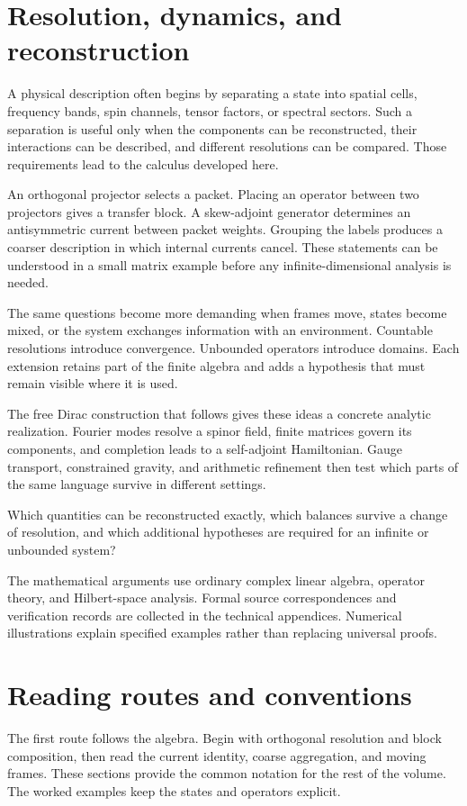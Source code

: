 \section*{Resolution, dynamics, and reconstruction}
A physical description often begins by separating a state into spatial cells, frequency bands, spin channels, tensor factors, or spectral sectors. Such a separation is useful only when the components can be reconstructed, their interactions can be described, and different resolutions can be compared. Those requirements lead to the calculus developed here.

An orthogonal projector selects a packet. Placing an operator between two projectors gives a transfer block. A skew-adjoint generator determines an antisymmetric current between packet weights. Grouping the labels produces a coarser description in which internal currents cancel. These statements can be understood in a small matrix example before any infinite-dimensional analysis is needed.

The same questions become more demanding when frames move, states become mixed, or the system exchanges information with an environment. Countable resolutions introduce convergence. Unbounded operators introduce domains. Each extension retains part of the finite algebra and adds a hypothesis that must remain visible where it is used.

The free Dirac construction that follows gives these ideas a concrete analytic realization. Fourier modes resolve a spinor field, finite matrices govern its components, and completion leads to a self-adjoint Hamiltonian. Gauge transport, constrained gravity, and arithmetic refinement then test which parts of the same language survive in different settings.

\begin{readerroadmap}[title={The organizing question}]
Which quantities can be reconstructed exactly, which balances survive a change of resolution, and which additional hypotheses are required for an infinite or unbounded system?
\end{readerroadmap}

The mathematical arguments use ordinary complex linear algebra, operator theory, and Hilbert-space analysis. Formal source correspondences and verification records are collected in the technical appendices. Numerical illustrations explain specified examples rather than replacing universal proofs.

\clearpage
\section*{Reading routes and conventions}
The first route follows the algebra. Begin with orthogonal resolution and block composition, then read the current identity, coarse aggregation, and moving frames. These sections provide the common notation for the rest of the volume. The worked examples keep the states and operators explicit.

